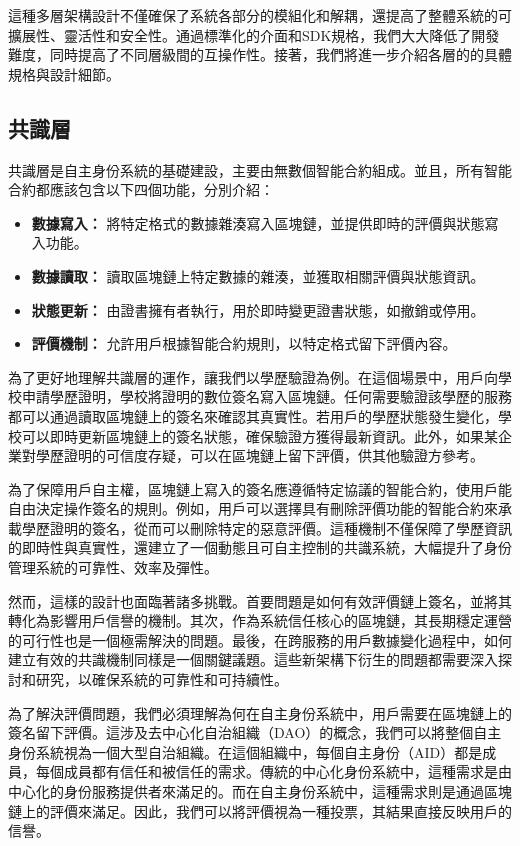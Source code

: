 這種多層架構設計不僅確保了系統各部分的模組化和解耦，還提高了整體系統的可擴展性、靈活性和安全性。通過標準化的介面和SDK規格，我們大大降低了開發難度，同時提高了不同層級間的互操作性。接著，我們將進一步介紹各層的的具體規格與設計細節。
\subsection{共識層}
共識層是自主身份系統的基礎建設，主要由無數個智能合約組成。並且，所有智能合約都應該包含以下四個功能，分別介紹：
\begin{itemize}
  \item \textbf{數據寫入：} 將特定格式的數據雜湊寫入區塊鏈，並提供即時的評價與狀態寫入功能。
  \item \textbf{數據讀取：} 讀取區塊鏈上特定數據的雜湊，並獲取相關評價與狀態資訊。
  \item \textbf{狀態更新：} 由證書擁有者執行，用於即時變更證書狀態，如撤銷或停用。
  \item \textbf{評價機制：} 允許用戶根據智能合約規則，以特定格式留下評價內容。
\end{itemize}
為了更好地理解共識層的運作，讓我們以學歷驗證為例。在這個場景中，用戶向學校申請學歷證明，學校將證明的數位簽名寫入區塊鏈。任何需要驗證該學歷的服務都可以通過讀取區塊鏈上的簽名來確認其真實性。若用戶的學歷狀態發生變化，學校可以即時更新區塊鏈上的簽名狀態，確保驗證方獲得最新資訊。此外，如果某企業對學歷證明的可信度存疑，可以在區塊鏈上留下評價，供其他驗證方參考。

為了保障用戶自主權，區塊鏈上寫入的簽名應遵循特定協議的智能合約，使用戶能自由決定操作簽名的規則。例如，用戶可以選擇具有刪除評價功能的智能合約來承載學歷證明的簽名，從而可以刪除特定的惡意評價。這種機制不僅保障了學歷資訊的即時性與真實性，還建立了一個動態且可自主控制的共識系統，大幅提升了身份管理系統的可靠性、效率及彈性。


然而，這樣的設計也面臨著諸多挑戰。首要問題是如何有效評價鏈上簽名，並將其轉化為影響用戶信譽的機制。其次，作為系統信任核心的區塊鏈，其長期穩定運營的可行性也是一個極需解決的問題。最後，在跨服務的用戶數據變化過程中，如何建立有效的共識機制同樣是一個關鍵議題。這些新架構下衍生的問題都需要深入探討和研究，以確保系統的可靠性和可持續性。

為了解決評價問題，我們必須理解為何在自主身份系統中，用戶需要在區塊鏈上的簽名留下評價。這涉及去中心化自治組織（DAO）的概念，我們可以將整個自主身份系統視為一個大型自治組織。在這個組織中，每個自主身份（AID）都是成員，每個成員都有信任和被信任的需求。傳統的中心化身份系統中，這種需求是由中心化的身份服務提供者來滿足的。而在自主身份系統中，這種需求則是通過區塊鏈上的評價來滿足。因此，我們可以將評價視為一種投票，其結果直接反映用戶的信譽。

